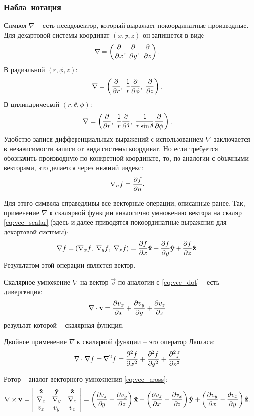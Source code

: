 \subsubsection{Набла--нотация}

Символ $\nabla$ -- есть псевдовектор, который выражает
покоординатные производные.
Для декартовой системы координат $(x, y, z)$ он запишется в виде
$$
\nabla = \left( \frac{\partial }{\partial x}, \; \frac{\partial }{\partial y}, \; \frac{\partial }{\partial z} \right).
$$
В радиальной $(r, \phi, z)$:
$$
\nabla = \left( \frac{\partial }{\partial r}, \; \frac{1}{r}\frac{\partial }{\partial \phi}, \; \frac{\partial }{\partial z} \right).
$$
В цилиндрической $(r, \theta, \phi)$:
$$
\nabla = \left( \frac{\partial }{\partial r}, \; \frac{1}{r}\frac{\partial }{\partial \theta}, \; \frac{1}{r\sin\theta}\frac{\partial }{\partial \phi} \right).
$$
Удобство записи дифференциальных выражений с использованием $\nabla$ заключается в независимости записи от
вида системы координат.
Но если требуется обозначить производную по конкретной координате,
то, по аналогии с обычными векторами, это делается через нижний индекс:
$$
\nabla_n f = \frac{\partial f}{\partial n}.
$$

Для этого символа справедливы все векторные операции, описанные ранее.
Так, применение $\nabla$ к скалярной функции аналогично умножению вектора
на скаляр \cref{eq:vec_scalar} (здесь и далее приводятся покоординатные выражения для декартовой системы):
\begin{equation}
\label{eq:del_grad}
\nabla f  = \left(\nabla_x f, \; \nabla_y f, \; \nabla_z f\right) = \frac{\partial f}{\partial x}\boldsymbol{\rm \hat x} + \frac{\partial f}{\partial y}\boldsymbol{\rm \hat y} + \frac{\partial f}{\partial z}\boldsymbol{\rm \hat z}.
\end{equation}
Результатом этой операции является вектор.

Скалярное умножение $\nabla$ на вектор $\vec v$ по аналогии с \cref{eq:vec_dot} -- есть дивергенция:
\begin{equation}
\label{eq:del_div}
\nabla \cdot \boldsymbol{\rm v}  = \frac{\partial v_x}{\partial x} + \frac{\partial v_y}{\partial y} + \frac{\partial v_z}{\partial z}
\end{equation}
результат которой -- скалярная функция.

Двойное применение $\nabla$ к скалярной функции -- это оператор Лапласа:
\begin{equation}
\label{eq:del_laplace}
\nabla \cdot \nabla f  = \nabla^2 f = \frac{\partial^2 f}{\partial x^2} + \frac{\partial^2 f}{\partial y^2} + \frac{\partial^2 f}{\partial z^2}
\end{equation}

Ротор -- аналог векторного умножнения \cref{eq:vec_cross}:
\begin{equation}
\label{eq:del_rotor}
\nabla\times\boldsymbol{\rm v} = 
\left|
\begin{array}{ccc}
\boldsymbol{\rm \hat x} & \boldsymbol{\rm \hat y} & \boldsymbol{\rm \hat z} \\
\nabla_x & \nabla_y & \nabla_z \\
v_x & v_y & v_z
\end{array}
\right| = 
\left(\frac{\partial v_z}{\partial y} - \frac{\partial v_y}{\partial z}\right)\boldsymbol{\rm \hat x} -
\left(\frac{\partial v_z}{\partial x} - \frac{\partial v_x}{\partial z}\right)\boldsymbol{\rm \hat y} +
\left(\frac{\partial v_y}{\partial x} - \frac{\partial v_x}{\partial y}\right)\boldsymbol{\rm \hat z}.
\end{equation}
